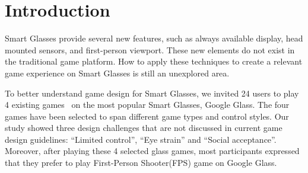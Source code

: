 \documentclass{acm_proc_article-sp}
\begin{document}



\section{Introduction}

Smart Glasses provide several new features, such as always available display, head mounted sensors, and first-person viewport. These new elements do not exist in the traditional game platform. How to apply these techniques to create a relevant game experience on Smart Glasses is still an unexplored area.

To better understand game design for Smart Glasses, we invited 24 users to play 4 existing games~\cite{minigame} on the most popular Smart Glasses, Google Glass. The four games have been selected to span different game types and control styles. Our study showed three design challenges that are not discussed in current game design guidelines: ``Limited control'', ``Eye strain'' and ``Social acceptance''. Moreover, after playing these 4 selected glass games, most participants expressed that they prefer to play First-Person Shooter(FPS) game on Google Glass. 

\end{document}
